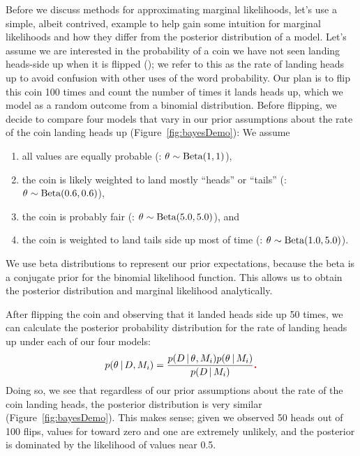 Before we discuss methods for approximating marginal likelihoods, let's use a
simple, albeit contrived, example to help gain some intuition for marginal
likelihoods and how they differ from the posterior distribution of a model.
Let's assume we are interested in the probability of a coin we have not seen
landing heads-side up when it is flipped (\probheads);
we refer to this as the rate of landing heads up to avoid confusion with other
uses of the word probability.
Our plan is to flip this coin 100 times and count the number of times it lands
heads up, which we model as a random outcome from a binomial distribution.
Before flipping, we decide to compare four models that vary in our prior
assumptions about the rate of the coin landing heads up
(Figure~\ref{fig:bayesDemo}):
We assume
\begin{enumerate}
    \item all values are equally probable
        (\coinmodel[1]: $\theta_{} \sim \textrm{Beta}(1, 1)$),
    \item the coin is likely weighted to land mostly ``heads'' or ``tails''
        (\coinmodel[2]: $\theta_{} \sim \textrm{Beta}(0.6, 0.6)$),
    \item the coin is probably fair
        (\coinmodel[3]: $\theta_{} \sim \textrm{Beta}(5.0, 5.0)$), and
    \item the coin is weighted to land tails side up most of time
        (\coinmodel[4]: $\theta_{} \sim \textrm{Beta}(1.0, 5.0)$).
\end{enumerate}
We use beta distributions to represent our prior expectations, because the
beta is a conjugate prior for the binomial likelihood function.
This allows us to obtain the posterior distribution and marginal likelihood
analytically.

\begin{linenomath}
After flipping the coin and observing that it landed heads side up 50 times, we
can calculate the posterior probability distribution for the rate of landing
heads up under each of our four models:
\begin{equation}
    p(\probheads \given \flipdata, \coinmodel[i]) = \frac{
        p(\flipdata \given \probheads, \coinmodel[i]) p(\probheads \given \coinmodel[i])
    }{
        p(\flipdata \given \coinmodel[i])
    } \vmadd{.}
    \label{eq:coinBayesRule}
\end{equation}
Doing so, we see that regardless of our prior assumptions about the rate of the
coin landing heads, the posterior distribution is very similar
(Figure~\ref{fig:bayesDemo}).
This makes sense; given we observed 50 heads out of 100 flips, values for
\probheads toward zero and one are extremely unlikely, and the posterior is
dominated by the likelihood of values near 0.5.
\end{linenomath}

